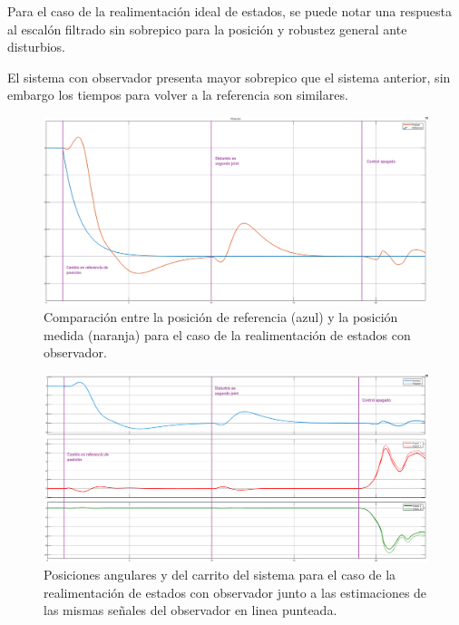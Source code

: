 Para el caso de la realimentación ideal de estados, se puede notar una respuesta al escalón filtrado sin sobrepico para la posición y robustez general ante disturbios. 


El sistema con observador presenta mayor sobrepico que el sistema anterior, sin embargo los tiempos para volver a la referencia son similares.

\begin{figure}[H]
	\centering
	\includegraphics[width=\linewidth]{../Analisis de Resultados/ImagenesAnalisis de Resultados/obsv_posref.png}
	\caption{Comparación entre la posición de referencia (azul) y la posición medida (naranja) para el caso de la realimentación de estados con observador.}	
	\label{fig:obsv_posref}
\end{figure}

\begin{figure}[H]
	\centering
	\includegraphics[width=\linewidth]{../Analisis de Resultados/ImagenesAnalisis de Resultados/obsv_vars.png}
	\caption{Posiciones angulares y del carrito del sistema para el caso de la realimentación de estados con observador junto a las estimaciones de las mismas señales del observador en linea punteada.}	
	\label{fig:obsv_vars}
\end{figure}

